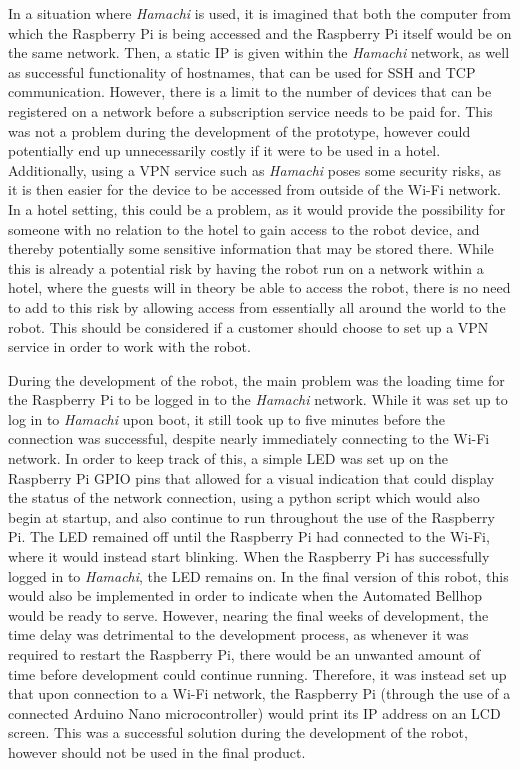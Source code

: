 \documentclass[11pt]{article}
\begin{document}
       
In a situation where \textit{Hamachi} is used, it is imagined that both the computer from which the Raspberry Pi is being accessed and the Raspberry Pi itself would be on the same network. Then, a static IP is given within the \textit{Hamachi} network, as well as successful functionality of hostnames, that can be used for SSH and TCP communication. However, there is a limit to the number of devices that can be registered on a network before a subscription service needs to be paid for. This was not a problem during the development of the prototype, however could potentially end up unnecessarily costly if it were to be used in a hotel. Additionally, using a VPN service such as \textit{Hamachi} poses some security risks, as it is then easier for the device to be accessed from outside of the Wi-Fi network. In a hotel setting, this could be a problem, as it would provide the possibility for someone with no relation to the hotel to gain access to the robot device, and thereby potentially some sensitive information that may be stored there. While this is already a potential risk by having the robot run on a network within a hotel, where the guests will in theory be able to access the robot, there is no need to add to this risk by allowing access from essentially all around the world to the robot. This should be considered if a customer should choose to set up a VPN service in order to work with the robot.

       
During the development of the robot, the main problem was the loading time for the Raspberry Pi to be logged in to the \textit{Hamachi} network. While it was set up to log in to \textit{Hamachi} upon boot, it still took up to five minutes before the connection was successful, despite nearly immediately connecting to the Wi-Fi network. In order to keep track of this, a simple LED was set up on the Raspberry Pi GPIO pins that allowed for a visual indication that could display the status of the network connection, using a python script which would also begin at startup, and also continue to run throughout the use of the Raspberry Pi. The LED remained off until the Raspberry Pi had connected to the Wi-Fi, where it would instead start blinking. When the Raspberry Pi has successfully logged in to \textit{Hamachi}, the LED remains on. In the final version of this robot, this would also be implemented in order to indicate when the Automated Bellhop would be ready to serve. However, nearing the final weeks of development, the time delay was detrimental to the development process, as whenever it was required to restart the Raspberry Pi, there would be an unwanted amount of time before development could continue running. Therefore, it was instead set up that upon connection to a Wi-Fi network, the Raspberry Pi (through the use of a connected Arduino Nano microcontroller) would print its IP address on an LCD screen. This was a successful solution during the development of the robot, however should not be used in the final product.
\end{document}
